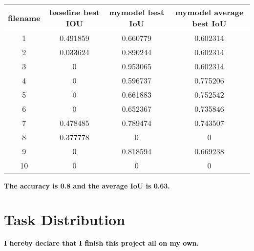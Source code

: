 \documentclass[12pt]{article}
\begin{document}
\begin{center}
\begin{tabular}{|c|c|c|c|}
\hline
filename & baseline best IOU & mymodel best IoU & mymodel average best IoU \\
\hline
1 & 0.491859 & 0.660779 & 0.602314 \\
\hline
2 & 0.033624 & 0.890244 & 0.602314 \\
\hline
3 & 0 & 0.953065 & 0.602314\\
\hline
4 & 0 & 0.596737 &  0.775206\\
\hline
5 & 0 & 0.661883 & 0.752542\\
\hline
6 & 0 & 0.652367 & 0.735846\\
\hline
7 & 0.478485 & 0.789474 &  0.743507\\
\hline
8 &  0.377778 & 0 & 0\\
\hline
9 & 0 & 0.818594 & 0.669238\\
\hline
10 & 0 & 0 & 0\\
\hline

\end{tabular}
\end{center}
\textbf{The accuracy is 0.8 and the average IoU is 0.63.}

\section*{Task Distribution}
\textbf{I hereby declare that I finish this project all on my own.}
\end{document}
